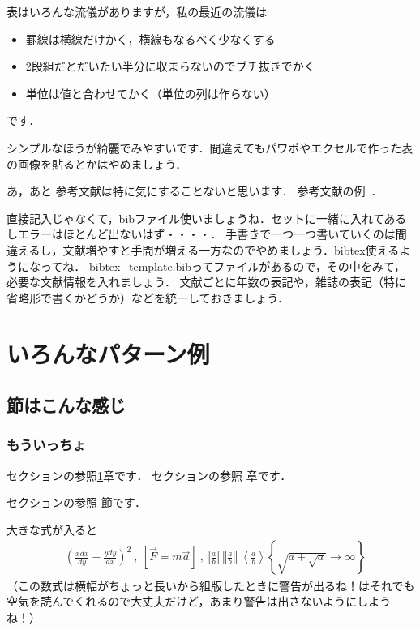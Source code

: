 \documentclass[platex,dvipdfmx]{jlreq}%
\numberwithin{equation}{section}%
\begin{document}
表はいろんな流儀がありますが，私の最近の流儀は
\begin{itemize}
 \item 罫線は横線だけかく，横線もなるべく少なくする
 \item 2段組だとだいたい半分に収まらないのでブチ抜きでかく
 \item 単位は値と合わせてかく（単位の列は作らない）
\end{itemize}
です．

シンプルなほうが綺麗でみやすいです．間違えてもパワポやエクセルで作った表の画像を貼るとかはやめましょう．

あ，あと
参考文献は特に気にすることないと思います．
参考文献の例~\cite{mike,bibtest}．

直接記入じゃなくて，bibファイル使いましょうね．セットに一緒に入れてあるしエラーはほとんど出ないはず・・・・．
手書きで一つ一つ書いていくのは間違えるし，文献増やすと手間が増える一方なのでやめましょう．bibtex使えるようになってね．
bibtex\_template.bibってファイルがあるので，その中をみて，必要な文献情報を入れましょう．
文献ごとに年数の表記や，雑誌の表記（特に省略形で書くかどうか）などを統一しておきましょう．%

\section{いろんなパターン例}\label{sec:基本}
\subsection{節はこんな感じ}\label{sec:基本2}
\subsubsection{もういっちょ}

セクションの参照\ref{sec:基本}章です．
セクションの参照 章です．

セクションの参照 節です．

大きな式が入ると
\begin{align}
 & \left(\frac{xdx}{dy} -\frac{ydy}{dx}\right)^{2} \ ,\ \left[\vec{F} =m\vec{a}\right] \ ,\ \left| \frac{a}{b}\right| \ \left\Vert \frac{a}{b}\right\Vert \ \left< \frac{a}{b}\right> \left\{\sqrt{a+\sqrt{a}}\rightarrow \infty \right\} 
\end{align}%
（この数式は横幅がちょっと長いから組版したときに警告が出るね！\LaTeXe はそれでも空気を読んでくれるので大丈夫だけど，あまり警告は出さないようにしようね！）
\end{document}
